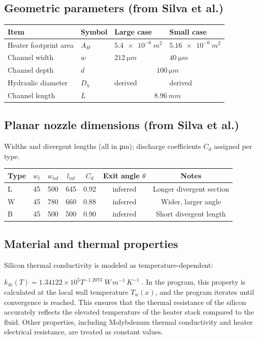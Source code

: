 \documentclass[11pt,a4paper]{article}
\begin{document}
\subsection*{Geometric parameters (from Silva et al.)}
\begin{tabular}{@{}llll@{}}
\toprule
Item & Symbol & Large case & Small case \\
\midrule
Heater footprint area & \(A_H\) & \(\SI{5.4e-6}{m^2}\) & \(\SI{5.16e-6}{m^2}\) \\
Channel width & \(w\) & \(\SI{212}{\micro m}\) & \(\SI{40}{\micro m}\) \\
Channel depth & \(d\) & \multicolumn{2}{c}{\(\SI{100}{\micro m}\)} \\
Hydraulic diameter & \(D_h\) & derived & derived \\
Channel length & \(L\) & \multicolumn{2}{c}{\(\SI{8.96}{mm}\)} \\
\bottomrule
\end{tabular}

\subsection*{Planar nozzle dimensions (from Silva et al.)}
Widths and divergent lengths (all in \si{\micro m}); discharge coefficients \(C_d\) assigned per type.

\begin{tabular}{@{}lcccccc@{}}
\toprule
Type & \(w_t\) & \(w_{nd}\) & \(l_{nd}\) & \(C_d\) & Exit angle \(\theta\) & Notes \\
\midrule
L & 45 & 500 & 645 & 0.92 & inferred & Longer divergent section \\
W & 45 & 780 & 660 & 0.88 & inferred & Wider, larger angle \\
B & 45 & 500 & 500 & 0.90 & inferred & Short divergent length \\
\bottomrule
\end{tabular}

\subsection*{Material and thermal properties}
Silicon thermal conductivity is modeled as temperature-dependent:


\noindent \(k_{Si}(T)=1.34122\times10^{5} T^{-1.2073}\;\si{W\,m^{-1}\,K^{-1}}\) \cite{SiConductivity}. In the program, this property is calculated at the local wall temperature \(T_w(x)\), and the program iterates until convergence is reached. This ensures that the thermal resistance of the silicon accurately reflects the elevated temperature of the heater stack compared to the fluid. Other properties, including Molybdenum thermal conductivity and heater electrical resistance, are treated as constant values.
\end{document}
